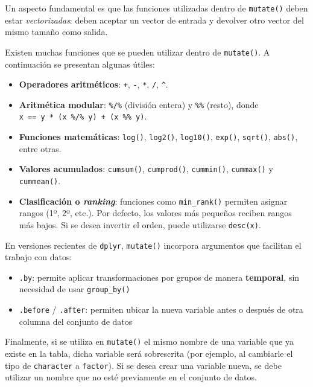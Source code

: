 \documentclass[
  spanish,
  a4paper,
]{scrbook}
\begin{document}
Un aspecto fundamental es que las funciones utilizadas dentro de
\texttt{mutate()} deben estar \emph{vectorizadas}: deben aceptar un
vector de entrada y devolver otro vector del mismo tamaño como salida.

Existen muchas funciones que se pueden utilizar dentro de
\texttt{mutate()}. A continuación se presentan algunas útiles:

\begin{itemize}
\item
  \textbf{Operadores aritméticos}: \texttt{+}, \texttt{-}, \texttt{*},
  \texttt{/}, \texttt{\^{}}.
\item
  \textbf{Aritmética modular}: \texttt{\%/\%} (división entera) y
  \texttt{\%\%} (resto), donde
  \texttt{x\ ==\ y\ *\ (x\ \%/\%\ y)\ +\ (x\ \%\%\ y)}.
\item
  \textbf{Funciones matemáticas}: \texttt{log()}, \texttt{log2()},
  \texttt{log10()}, \texttt{exp()}, \texttt{sqrt()}, \texttt{abs()},
  entre otras.
\item
  \textbf{Valores acumulados}: \texttt{cumsum()}, \texttt{cumprod()},
  \texttt{cummin()}, \texttt{cummax()} y \texttt{cummean()}.
\item
  \textbf{Clasificación o \emph{ranking}}: funciones como
  \texttt{min\_rank()} permiten asignar rangos (1º, 2º, etc.). Por
  defecto, los valores más pequeños reciben rangos más bajos. Si se
  desea invertir el orden, puede utilizarse \texttt{desc(x)}.
\end{itemize}

En versiones recientes de \texttt{dplyr}, \texttt{mutate()} incorpora
argumentos que facilitan el trabajo con datos:

\begin{itemize}
\item
  \texttt{.by}: permite aplicar transformaciones por grupos de manera
  \textbf{temporal}, sin necesidad de usar \texttt{group\_by()}
\item
  \texttt{.before} / \texttt{.after}: permiten ubicar la nueva variable
  antes o después de otra columna del conjunto de datos
\end{itemize}

Finalmente, si se utiliza en \texttt{mutate()} el mismo nombre de una
variable que ya existe en la tabla, dicha variable será sobrescrita (por
ejemplo, al cambiarle el tipo de \texttt{character} a \texttt{factor}).
Si se desea crear una variable nueva, se debe utilizar un nombre que no
esté previamente en el conjunto de datos.
\end{document}
